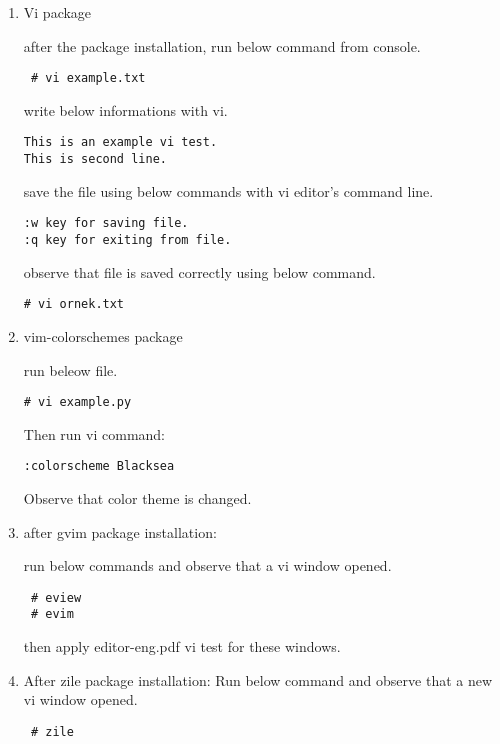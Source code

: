 \documentclass[a4paper,10pt]{article}
\begin{document}
\begin{enumerate}

\item Vi package

after the package installation, run below command from console.

\begin{verbatim}
 # vi example.txt
\end{verbatim}

write below informations with vi.
\begin{verbatim}
This is an example vi test.
This is second line.
\end{verbatim}

save the file using below commands with vi editor's command line.
\begin{verbatim}
:w key for saving file.
:q key for exiting from file.
\end{verbatim}

observe that file is saved correctly using below command.
\begin{verbatim}
# vi ornek.txt 
\end{verbatim}

\item vim-colorschemes package

run beleow file.
\begin{verbatim}
# vi example.py
\end{verbatim}

Then run vi command:
\begin{verbatim}
:colorscheme Blacksea
\end{verbatim}

Observe that color theme is changed.


\item after gvim package installation:

run below commands and observe that a vi window opened.
\begin{verbatim}
 # eview
 # evim
\end{verbatim}

then apply editor-eng.pdf vi test for these windows.

\item After zile package installation:
Run below command and observe that a new vi window opened.
\begin{verbatim}
 # zile
\end{verbatim}


\end{enumerate}
\end{document}
